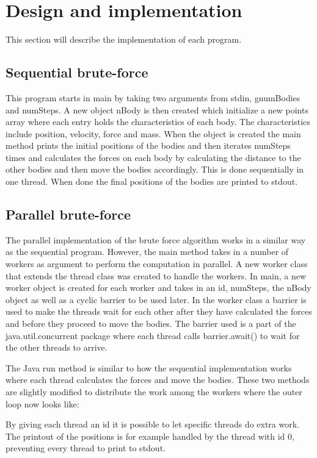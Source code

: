 \documentclass{article}
\begin{document}
\section{Design and implementation}

This section will describe the implementation of each program.

\subsection{Sequential brute-force}

This program starts in main by taking two arguments from stdin, gnumBodies and numSteps. A new object nBody is then created which initialize a new points array where each entry holds the characteristics of each body. The characteristics include position, velocity, force and mass. When the object is created the main method prints the initial positions of the bodies and then iterates numSteps times and calculates the forces on each body by calculating the distance to the other bodies and then move the bodies accordingly. This is done sequentially in one thread. When done the final positions of the bodies are printed to stdout. 

\subsection{Parallel brute-force}

The parallel implementation of the brute force algorithm works in a similar way as the sequential program. However, the main method takes in a number of workers as argument to perform the computation in parallel. A new worker class that extends the thread class was created to handle the workers. In main, a new worker object is created for each worker and takes in an id, numSteps, the nBody object as well as a cyclic barrier to be used later. In the worker class a barrier is used to make the threads wait for each other after they have calculated the forces and before they proceed to move the bodies. The barrier used is a part of the java.util.concurrent package where each thread calls barrier.await() to wait for the other threads to arrive. 

The Java run method is similar to how the sequential implementation works where each thread calculates the forces and move the bodies. These two methods are slightly modified to distribute the work among the workers where the outer loop now looks like: 

By giving each thread an id it is possible to let specific threads do extra work. The printout of the positions is for example handled by the thread with id 0, preventing every thread to print to stdout. 
\end{document}
